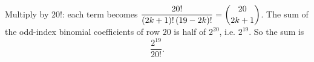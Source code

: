Multiply by $20!$: each term becomes $\dfrac{20!}{(2k+1)!\,(19-2k)!}=\dbinom{20}{2k+1}$. The sum of the odd-index binomial coefficients of row $20$ is half of $2^{20}$, i.e. $2^{19}$. So the sum is
\[
\boxed{\dfrac{2^{19}}{20!}}.
\]
